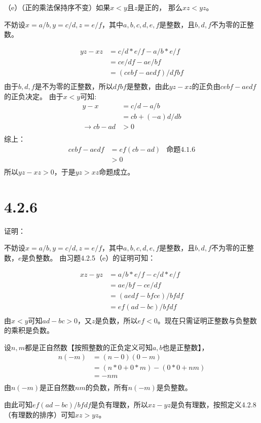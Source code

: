 \documentclass{article}
\theoremstyle{mystyle}
\begin{document}
（e）（正的乘法保持序不变）如果$x < y$且$z$是正的， 那么$xz < yz$。

不妨设$x = a/b, y = c/d, z = e/f$，其中$a,b,c,d,e,f$是整数，且$b,d,f$不为零的正整数。

\begin{align*}
  yz - xz & = c/d * e/f - a/b * e/f \\
          & = ce/df - ae/bf         \\
          & = (cebf - aedf) / dfbf  \\
\end{align*}
由于$b,d,f$是不为零的正整数，所以$dfbf$是整数，由此$yz - xz$的正负由$cebf - aedf$的正负决定。
由于$x<y$可知:
\begin{align*}
  y-x                 & = c/d-a/b         \\
                      & = cb + (-a)d / db \\
  \rightarrow cb - ad & > 0               \\
\end{align*}
综上：
\begin{align*}
  cebf - aedf & = ef(cb-ad) & \text{命题4.1.6} \\
              & > 0                          \\
\end{align*}
所以$yz - xz > 0$，于是$yz > xz$命题成立。

\section*{4.2.6}

证明：

不妨设$x = a/b, y = c/d, z = e/f$，其中$a,b,c,d,e,f$是整数，且$b,d,f$不为零的正整数，$e$是负整数。
由习题4.2.5（e）的证明可知：

\begin{align*}
  xz - yz & = a/b * e/f - c/d * e/f \\
          & = ae / bf - ce / df     \\
          & = (aedf - bfce ) / bfdf \\
          & = ef(ad - bc) / bfdf    \\
\end{align*}
由$x<y$可知$ad - bc > 0$，又$z$是负数，所以$ef < 0$。现在只需证明正整数与负整数的乘积是负数。

设$n,m$都是正自然数【按照整数的正负定义可知$a,b$也是正整数】，
\begin{align*}
  n(-m) & = (n-0)(0-m)               \\
        & = (n*0 + 0*m) - (0*0 + nm) \\
        & = -nm                      \\
\end{align*}
由$n(-m)$是正自然数$nm$的负数，所有$n(-m)$是负整数。

由此可知$ef(ad - bc)/ bfdf$是负有理数，所以$xz - yz$是负有理数，按照定义4.2.8（有理数的排序）可知$xz > yz$。
\end{document}

